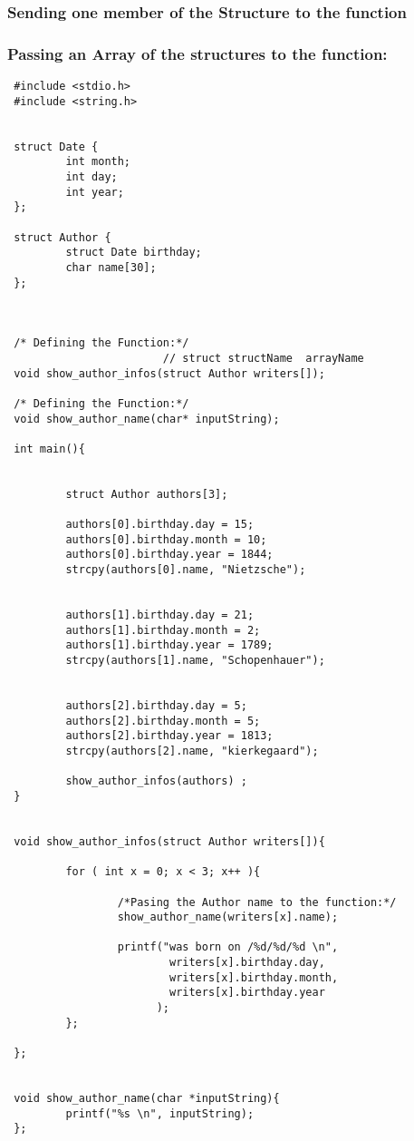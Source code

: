 \subsubsection{Sending one member of the Structure to the function}


\subsubsection{Passing an Array of the structures to the function:}

\begin{lstlisting}
 #include <stdio.h>
 #include <string.h>


 struct Date {
         int month;
         int day;
         int year;
 };

 struct Author {
         struct Date birthday;
         char name[30];
 };



 /* Defining the Function:*/
                        // struct structName  arrayName
 void show_author_infos(struct Author writers[]);

 /* Defining the Function:*/
 void show_author_name(char* inputString);

 int main(){


         struct Author authors[3];

         authors[0].birthday.day = 15;
         authors[0].birthday.month = 10;
         authors[0].birthday.year = 1844;
         strcpy(authors[0].name, "Nietzsche");


         authors[1].birthday.day = 21;
         authors[1].birthday.month = 2;
         authors[1].birthday.year = 1789;
         strcpy(authors[1].name, "Schopenhauer");


         authors[2].birthday.day = 5;
         authors[2].birthday.month = 5;
         authors[2].birthday.year = 1813;
         strcpy(authors[2].name, "kierkegaard");

         show_author_infos(authors) ;
 }


 void show_author_infos(struct Author writers[]){

         for ( int x = 0; x < 3; x++ ){

                 /*Pasing the Author name to the function:*/
                 show_author_name(writers[x].name);

                 printf("was born on /%d/%d/%d \n",
                         writers[x].birthday.day,
                         writers[x].birthday.month,
                         writers[x].birthday.year
                       );
         };

 };


 void show_author_name(char *inputString){
         printf("%s \n", inputString);
 };
\end{lstlisting}
